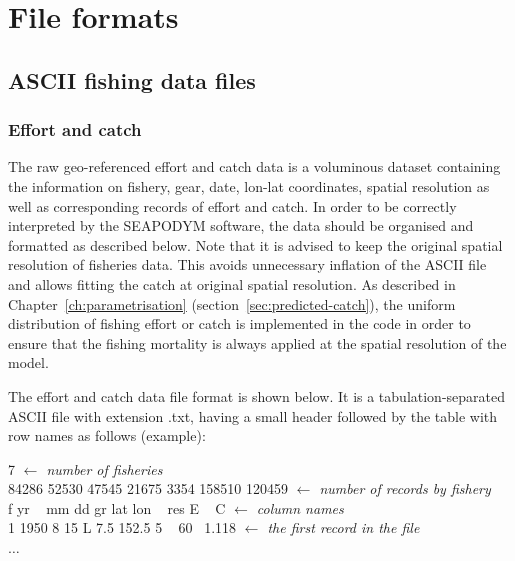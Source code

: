 \chapter{File formats}\label{annex:file-formats}

\section{ASCII fishing data files}\label{appendix-ascii}

\subsection{Effort and catch}\label{sec:EC-datafile}

The raw geo-referenced effort and catch data is a voluminous dataset containing the information on fishery, gear, date, lon-lat coordinates, spatial resolution as well as corresponding records of effort and catch. In order to be correctly interpreted by the SEAPODYM software, the data should be organised and formatted as described below. Note that it is advised to keep the original spatial resolution of fisheries data. This avoids unnecessary inflation of the ASCII file and allows fitting the catch at original spatial resolution. As described in Chapter~\ref{ch:parametrisation} (section~\ref{sec:predicted-catch}), the uniform distribution of fishing effort or catch is implemented in the code in order to ensure that the fishing mortality is always applied at the spatial resolution of the model.       
  
The effort and catch data file format is shown below. It is a tabulation-separated ASCII file with extension .txt, having a small header followed by the table with row names as follows (example):

\vspace{1cm}
{\ttfamily
  \noindent \hspace*{0.5cm} 7} 
 \hspace*{9.25cm}  \textit{{\color{blue}$\leftarrow$ number of fisheries}}\\
{\ttfamily  \hspace*{0.5cm} 84286 52530 47545 21675 3354 158510  120459} 
 \hspace*{0.5cm}\textit{{\color{blue}$\leftarrow$ number of records by fishery}}\\
{\ttfamily  \hspace*{0.5cm} f yr \mbox{ } mm dd gr lat lon \mbox{ } res E  \mbox{ } C}
 \hspace*{2cm}\textit{{\color{blue}$\leftarrow$ column names}}\\
{\ttfamily  \hspace*{0.5cm} 1 1950 8 \text{ }15 L \mbox{} 7.5 152.5 5 \mbox{ } 60 \mbox{ }1.118}
 \hspace*{1.15cm}\textit{{\color{blue}$\leftarrow$ the first record in the file}}\\
  \hspace*{0.65cm} $\dots$
\vspace{0.5cm}		

